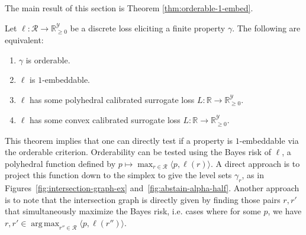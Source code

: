 \documentclass[anon]{colt2020} %
\newcommand{\reals}{\mathbb{R}}
\newcommand{\nonnegreals}{\reals_{\geq 0}}%
\newcommand{\R}{\mathcal{R}}
\newcommand{\Y}{\mathcal{Y}}
\newcommand{\inprod}[2]{\langle #1, #2 \rangle}%
\DeclareMathOperator*{\argmax}{arg\,max}
\begin{document}
The main result of this section is Theorem \ref{thm:orderable-1-embed}.
\begin{theorem} \label{thm:orderable-1-embed}
  Let $\ell: \R \to \nonnegreals^{\Y}$ be a discrete loss eliciting a finite property $\gamma$.
  The following are equivalent:
  \begin{enumerate}
    \item $\gamma$ is orderable.
    \item $\ell$ is $1$-embeddable.
    \item $\ell$ has some polyhedral calibrated surrogate loss $L: \reals \to \nonnegreals^{\Y}$.
    \item $\ell$ has some convex calibrated surrogate loss $L: \reals \to \nonnegreals^{\Y}$.
  \end{enumerate}
\end{theorem}
This theorem implies that one can directly test if a property is $1$-embeddable via the orderable criterion.
Orderability can be tested using the Bayes risk of $\ell$, a polyhedral function defined by $p \mapsto \max_{r \in \R} \inprod{p}{\ell(r)}$.
A direct approach is to project this function down to the simplex to give the level sets $\gamma_r$, as in Figures~\ref{fig:intersection-graph-ex} and~\ref{fig:abstain-alpha-half}.
Another approach is to note that the intersection graph is directly given by finding those pairs $r,r'$ that simultaneously maximize the Bayes risk, i.e. cases where for some $p$, we have $r,r' \in \argmax_{r'' \in \R} \inprod{p}{\ell(r'')}$.
\end{document}
